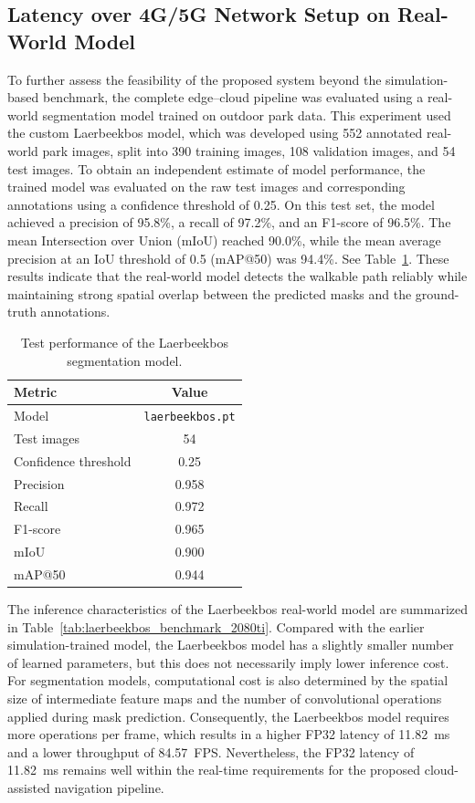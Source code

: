 \documentclass{ieeeaccess}
\begin{document}
\subsection{Latency over 4G/5G Network Setup on Real-World Model}
\label{sec}

To further assess the feasibility of the proposed system beyond the simulation-based benchmark, the complete edge--cloud pipeline was evaluated using a real-world segmentation model trained on outdoor park data. This experiment used the custom Laerbeekbos model, which was developed using 552 annotated real-world park images, split into 390 training images, 108 validation images, and 54 test images. To obtain an independent estimate of model performance, the trained model was evaluated on the raw test images and corresponding annotations using a confidence threshold of 0.25. On this test set, the model achieved a precision of 95.8\%, a recall of 97.2\%, and an F1-score of 96.5\%. The mean Intersection over Union (mIoU) reached 90.0\%, while the mean average precision at an IoU threshold of 0.5 (mAP@50) was 94.4\%. See Table~\ref{tab:laerbeekbos-test-performance}. These results indicate that the real-world model detects the walkable path reliably while maintaining strong spatial overlap between the predicted masks and the ground-truth annotations.

\begin{table}[htbp]
\centering
\caption{Test performance of the Laerbeekbos segmentation model.}
\label{tab:laerbeekbos-test-performance}
\begin{tabular}{lc}
\hline
\textbf{Metric} & \textbf{Value} \\
\hline
Model & \texttt{laerbeekbos.pt} \\
Test images & 54 \\
Confidence threshold & 0.25 \\
Precision & 0.958 \\
Recall & 0.972 \\
F1-score & 0.965 \\
mIoU & 0.900 \\
mAP@50 & 0.944 \\
\hline
\end{tabular}
\end{table}


The inference characteristics of the Laerbeekbos real-world model are summarized in Table~\ref{tab:laerbeekbos_benchmark_2080ti}. Compared with the earlier simulation-trained model, the Laerbeekbos model has a slightly smaller number of learned parameters, but this does not necessarily imply lower inference cost. For segmentation models, computational cost is also determined by the spatial size of intermediate feature maps and the number of convolutional operations applied during mask prediction. Consequently, the Laerbeekbos model requires more operations per frame, which results in a higher FP32 latency of 11.82~ms and a lower throughput of 84.57~FPS. Nevertheless, the FP32 latency of 11.82~ms remains well within the real-time requirements for the proposed cloud-assisted navigation pipeline.
\end{document}
